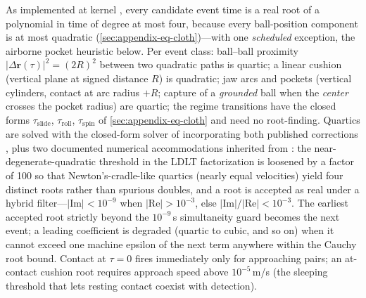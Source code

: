 As implemented at kernel , every candidate event
time is a real root of a polynomial in time of degree at most four,
because every ball-position component is at most quadratic
(\ref{sec:appendix-eq-cloth})---with one \emph{scheduled} exception,
the airborne pocket heuristic below. Per event class: ball--ball
proximity $|\Delta\mathbf{r}(\tau)|^{2} = (2R)^{2}$ between two
quadratic paths is quartic; a linear cushion (vertical plane at signed
distance $R$) is quadratic; jaw arcs and pockets (vertical cylinders,
contact at arc radius $+R$; capture of a \emph{grounded} ball when the
\emph{center} crosses the pocket radius) are quartic; the regime
transitions have the closed
forms $\tau_{\mathrm{slide}}$, $\tau_{\mathrm{roll}}$,
$\tau_{\mathrm{spin}}$ of \ref{sec:appendix-eq-cloth} and
need no root-finding. Quartics are solved with the closed-form solver
of \citet{orellana2020algorithm1010} incorporating both published
corrections \citep{demichele2022remark,demichele2024remark}, plus two
documented numerical accommodations inherited from
\citet{kiefl2024pooltool}: the near-degenerate-quadratic threshold in
the LDLT factorization is loosened by a factor of 100 so that
Newton's-cradle-like quartics (nearly equal velocities) yield four
distinct roots rather than spurious doubles, and a root is accepted as
real under a hybrid filter---$|\mathrm{Im}| < 10^{-9}$ when
$|\mathrm{Re}| > 10^{-3}$, else $|\mathrm{Im}|/|\mathrm{Re}| <
10^{-3}$. The earliest accepted root strictly beyond the $10^{-9}$\,s
simultaneity guard becomes the next event; a leading coefficient is
degraded (quartic to cubic, and so on) when it cannot exceed one
machine epsilon of the next term anywhere within the Cauchy root
bound. Contact at $\tau = 0$ fires immediately only for approaching
pairs; an at-contact cushion root requires approach speed above
$10^{-5}$\,m/s (the sleeping threshold that lets resting contact
coexist with detection).

